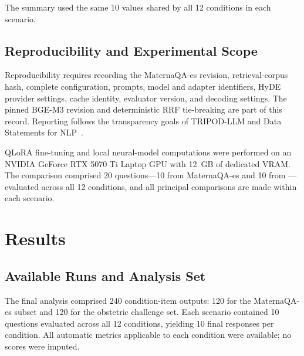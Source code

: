The summary used the same 10  values shared by all 12
conditions in each scenario.

\subsection{Reproducibility and Experimental Scope}
Reproducibility requires recording the MaternaQA-es revision,
retrieval-corpus hash, complete configuration, prompts, model and adapter
identifiers, HyDE provider settings, cache identity, evaluator version, and
decoding settings. The pinned BGE-M3 revision and deterministic RRF
tie-breaking are part of this record. Reporting follows the transparency
goals of TRIPOD-LLM and Data Statements for
NLP~\cite{gallifant2025tripod,bender2018data}.

QLoRA fine-tuning and local neural-model computations were performed on an
NVIDIA GeForce RTX 5070 Ti Laptop GPU with 12~GB of dedicated VRAM.
The comparison comprised 20 questions---10 from MaternaQA-es and 10 from
---evaluated across all 12 conditions, and all principal
comparisons are made within each scenario.

\section{Results}
\subsection{Available Runs and Analysis Set}
The final analysis comprised 240 condition-item outputs: 120 for the
MaternaQA-es subset and 120 for the obstetric challenge set. Each scenario
contained 10 questions evaluated across all 12 conditions, yielding 10 final
responses per condition. All automatic metrics applicable to each condition
were available; no scores were imputed.

